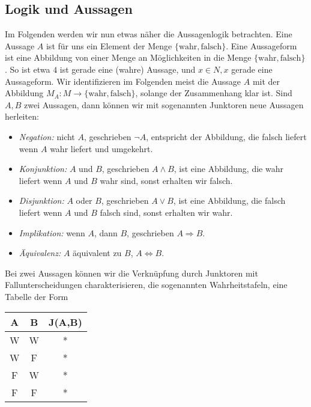 \documentclass[letterpaper,10pt,english]{jupyterBook}
\begin{document}
\subsection{Logik und Aussagen}
\label{\detokenize{grundlagen/mengenlogik:logik-und-aussagen}}
Im Folgenden werden wir nun etwas näher die Aussagenlogik betrachten. Eine Aussage \(A\) ist für uns ein Element der Menge \(\{\text{wahr},\text{falsch}\}\). Eine Aussageform ist eine Abbildung von einer Menge an Möglichkeiten in die Menge \(\{\text{wahr},\text{falsch}\}\). So ist etwa \(4\) ist gerade eine (wahre) Aussage, und \(x \in N, x\) gerade eine Aussageform. Wir identifizieren im Folgenden meist die Aussage \(A\) mit der Abbildung \(M_A:M \rightarrow \{\text{wahr},\text{falsch}\}\), solange der Zusammenhang klar ist.
Sind \(A,B\) zwei Aussagen, dann können wir mit sogenannten Junktoren neue Aussagen herleiten:
\begin{itemize}
\item {} 
\emph{Negation:} nicht \(A\), geschrieben \(\lnot A\), entspricht der Abbildung, die falsch liefert wenn \(A\) wahr liefert und umgekehrt.

\item {} 
\emph{Konjunktion:} \(A\) und \(B\), geschrieben \(A \land B\), ist eine Abbildung, die wahr liefert wenn \(A\) und \(B\) wahr sind, sonst erhalten wir falsch.

\item {} 
\emph{Disjunktion:} \(A\) oder \(B\), geschrieben \(A \lor B\), ist eine Abbildung, die falsch liefert wenn \(A\) und \(B\) falsch sind, sonst erhalten wir wahr.

\item {} 
\emph{Implikation:} wenn \(A\), dann \(B\), geschrieben \(A \Rightarrow B\).

\item {} 
\emph{Äquivalenz:} \(A\) äquivalent zu \(B\), \(A \Leftrightarrow B\).

\end{itemize}

Bei zwei Aussagen können wir die Verknüpfung durch Junktoren mit Fallunterscheidungen charakterisieren, die sogenannten Wahrheitstafeln, eine Tabelle der Form


\begin{center}
\centering
\begin{tabularx}{\linewidth}[{\linewidth}]{|c|c|c|}\hline
 
A
& 
B
& 
J(A,B)
\\
\hline
W
&
W
&
*
\\
\hline
W
&
F
&
*
\\
\hline
F
&
W
&
*
\\
\hline
F
&
F
&
*
\\
\hline
\end{tabularx}
\end{center}
\end{document}
